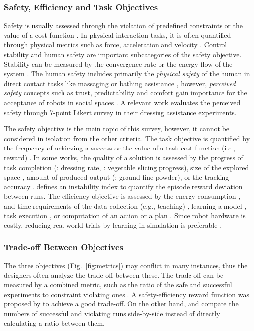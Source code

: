 \documentclass[Afour,sageh,times]{template/sagej}
\newcommand{\remember}[1]{{\color{gray} #1}}
\begin{document}
\subsubsection{Safety, Efficiency and Task Objectives}

Safety is usually assessed through the violation of predefined constraints \citep{13, 11} or the value of a cost function \citep{65}. 
In physical interaction tasks, it is often quantified through physical metrics such as force, acceleration and velocity \citep{36, 44}.
Control stability and human safety are important subcategories of the safety objective.
Stability can be measured by the convergence rate \citep{21, 2} or the energy flow of the system \citep{zanella2024learning,zhang2025passivity,375}. 
The human safety includes primarily the \textit{physical safety} of the human in direct contact tasks like massaging or bathing assistance \citep{19, 5}, however, \textit{perceived safety} concepts such as trust, predictability and comfort gain importance for the acceptance of robots in social spaces \citep{52}. 
A relevant work \citep{9} evaluates the perceived safety through 7-point Likert survey in their dressing assistance experiments.

The safety objective is the main topic of this survey, however, it cannot be considered in isolation from the other criteria. 
The task objective is quantified by the frequency of achieving a success \citep{94} or the value of a task cost function (i.e., reward) \citep{95}. In some works, the quality of a solution is assessed by the progress of task completion (\cite{9}: dressing rate, \cite{21}: vegetable slicing progress), size of the explored space \citep{1}, amount of produced output (\cite{12}: ground fine powder), or the tracking accuracy \citep{5}. \cite{20} defines an instability index to quantify the episode reward deviation between runs. 
The efficiency objective is assessed by the energy consumption \citep{86}, and time requirements of the data collection (e.g., teaching) \citep{82}, learning a model \citep{99}, task execution \citep{95, 3}, or computation of an action or a plan \citep{94, 15}. 
Since robot hardware is costly, reducing real-world trials by learning in simulation is preferable \citep{4}.

\subsubsection{Trade-off Between Objectives}

The three objectives (Fig.~\ref{fig:metrics}) may conflict in many instances, thus the designers often analyze the trade-off between these. 
The trade-off can be measured by a combined metric, such as the ratio of the safe and successful experiments to constraint violating ones \citep{91, zhang2024srl}.
A safety-efficiency reward function was proposed by \cite{28} to achieve a good trade-off. 
On the other hand, 
\cite{11} and \cite{13} compare the numbers of successful and violating runs side-by-side instead of directly calculating a ratio between them. 
\end{document}
